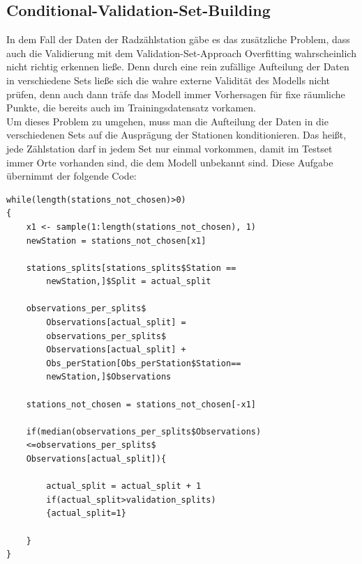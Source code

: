 \documentclass[a4paper,12pt]{thesis}
\begin{document}
\subsection{Conditional-Validation-Set-Building}

In dem Fall der Daten der Radzählstation gäbe es das zusätzliche Problem, dass auch die Validierung mit dem Validation-Set-Approach Overfitting wahrscheinlich nicht richtig erkennen ließe. Denn durch eine rein zufällige Aufteilung der Daten in verschiedene Sets ließe sich die wahre externe Validität des Modells nicht prüfen, denn auch dann träfe das Modell immer Vorhersagen für fixe räumliche Punkte, die bereits auch im Trainingsdatensatz vorkamen.\\
Um dieses Problem zu umgehen, muss man die Aufteilung der Daten in die verschiedenen Sets auf die Ausprägung der Stationen konditionieren. Das heißt, jede Zählstation darf in jedem Set nur einmal vorkommen, damit im Testset immer Orte vorhanden sind, die dem Modell unbekannt sind. Diese Aufgabe übernimmt der folgende Code:


\begin{lstlisting}[caption={Aufteilung der Zählstationen},label=code:valSetBui]
while(length(stations_not_chosen)>0)
{
	x1 <- sample(1:length(stations_not_chosen), 1)
	newStation = stations_not_chosen[x1]
	
	stations_splits[stations_splits$Station == 
		newStation,]$Split = actual_split
	
	observations_per_splits$
		Observations[actual_split] = 				
		observations_per_splits$
		Observations[actual_split] + 
		Obs_perStation[Obs_perStation$Station== 
		newStation,]$Observations
	
	stations_not_chosen = stations_not_chosen[-x1]
	
	if(median(observations_per_splits$Observations)
	<=observations_per_splits$
	Observations[actual_split]){
		
		actual_split = actual_split + 1
		if(actual_split>validation_splits)
		{actual_split=1}
		
	}
}
\end{lstlisting}
\end{document}
